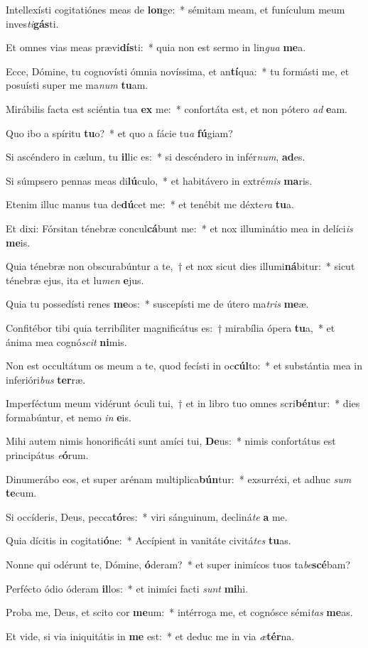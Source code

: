 \item Intellexísti cogitatiónes meas de \textbf{lon}ge:~* sémitam meam, et funículum meum inves\textit{ti}\textbf{gás}ti.
\item Et omnes vias meas prævi\textbf{dís}ti:~* quia non est sermo in lin\textit{gua} \textbf{me}a.
\item Ecce, Dómine, tu cognovísti ómnia novíssima, et an\textbf{tí}qua:~* tu formásti me, et posuísti super me ma\textit{num} \textbf{tu}am.
\item Mirábilis facta est sciéntia tua \textbf{ex} me:~* confortáta est, et non pótero \textit{ad} \textbf{e}am.
\item Quo ibo a spíritu \textbf{tu}o?~* et quo a fácie tu\textit{a} \textbf{fú}giam?
\item Si ascéndero in cælum, tu \textbf{il}lic es:~* si descéndero in infér\textit{num}, \textbf{ad}es.
\item Si súmpsero pennas meas di\textbf{lú}culo,~* et habitávero in extré\textit{mis} \textbf{ma}ris.
\item Etenim illuc manus tua de\textbf{dú}cet me:~* et tenébit me déxte\textit{ra} \textbf{tu}a.
\item Et dixi: Fórsitan ténebræ concul\textbf{cá}bunt me:~* et nox illuminátio mea in delíci\textit{is} \textbf{me}is.
\item Quia ténebræ non obscurabúntur a te,~† et nox sicut dies illumi\textbf{ná}bitur:~* sicut ténebræ ejus, ita et lu\textit{men} \textbf{e}jus.
\item Quia tu possedísti renes \textbf{me}os:~* suscepísti me de útero ma\textit{tris} \textbf{me}æ.
\item Confitébor tibi quia terribíliter magnificátus es:~† mirabília ópera \textbf{tu}a,~* et ánima mea cognó\textit{scit} \textbf{ni}mis.
\item Non est occultátum os meum a te, quod fecísti in oc\textbf{cúl}to:~* et substántia mea in inferióri\textit{bus} \textbf{ter}ræ.
\item Imperféctum meum vidérunt óculi tui,~† et in libro tuo omnes scri\textbf{bén}tur:~* dies formabúntur, et nemo \textit{in} \textbf{e}is.
\item Mihi autem nimis honorificáti sunt amíci tui, \textbf{De}us:~* nimis confortátus est principátus \textit{e}\textbf{ó}rum.
\item Dinumerábo eos, et super arénam multiplica\textbf{bún}tur:~* exsurréxi, et adhuc \textit{sum} \textbf{te}cum.
\item Si occíderis, Deus, pecca\textbf{tó}res:~* viri sánguinum, decliná\textit{te} \textbf{a} me.
\item Quia dícitis in cogitati\textbf{ó}ne:~* Accípient in vanitáte civitá\textit{tes} \textbf{tu}as.
\item Nonne qui odérunt te, Dómine, \textbf{ó}deram?~* et super inimícos tuos ta\textit{be}\textbf{scé}bam?
\item Perfécto ódio óderam \textbf{il}los:~* et inimíci facti \textit{sunt} \textbf{mi}hi.
\item Proba me, Deus, et scito cor \textbf{me}um:~* intérroga me, et cognósce sémi\textit{tas} \textbf{me}as.
\item Et vide, si via iniquitátis in \textbf{me} est:~* et deduc me in via \textit{æ}\textbf{tér}na.
